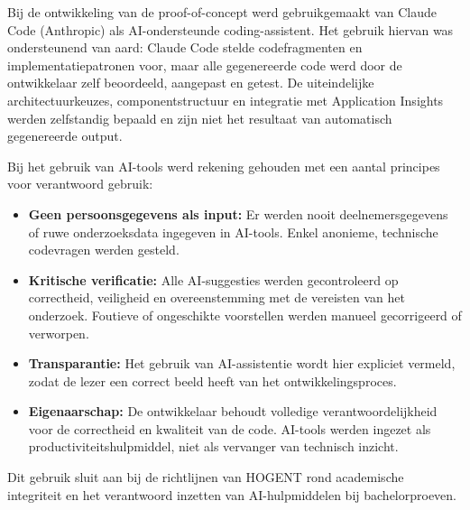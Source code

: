 Bij de ontwikkeling van de proof-of-concept werd gebruikgemaakt van Claude Code (Anthropic) als AI-ondersteunde coding-assistent. Het gebruik hiervan was ondersteunend van aard: Claude Code stelde codefragmenten en implementatiepatronen voor, maar alle gegenereerde code werd door de ontwikkelaar zelf beoordeeld, aangepast en getest. De uiteindelijke architectuurkeuzes, componentstructuur en integratie met Application Insights werden zelfstandig bepaald en zijn niet het resultaat van automatisch gegenereerde output.

Bij het gebruik van AI-tools werd rekening gehouden met een aantal principes voor verantwoord gebruik:

\begin{itemize}
  \item \textbf{Geen persoonsgegevens als input:} Er werden nooit deelnemersgegevens of ruwe onderzoeksdata ingegeven in AI-tools. Enkel anonieme, technische codevragen werden gesteld.
  \item \textbf{Kritische verificatie:} Alle AI-suggesties werden gecontroleerd op correctheid, veiligheid en overeenstemming met de vereisten van het onderzoek. Foutieve of ongeschikte voorstellen werden manueel gecorrigeerd of verworpen.
  \item \textbf{Transparantie:} Het gebruik van AI-assistentie wordt hier expliciet vermeld, zodat de lezer een correct beeld heeft van het ontwikkelingsproces.
  \item \textbf{Eigenaarschap:} De ontwikkelaar behoudt volledige verantwoordelijkheid voor de correctheid en kwaliteit van de code. AI-tools werden ingezet als productiviteitshulpmiddel, niet als vervanger van technisch inzicht.
\end{itemize}

Dit gebruik sluit aan bij de richtlijnen van HOGENT rond academische integriteit en het verantwoord inzetten van AI-hulpmiddelen bij bachelorproeven.
